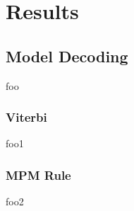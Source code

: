\graphicspath{{results/fig/}}

\chapter{Results}
\label{chap:results}


\section{Model Decoding}
foo
\subsection{Viterbi}
foo1
\subsection{MPM Rule}
foo2
